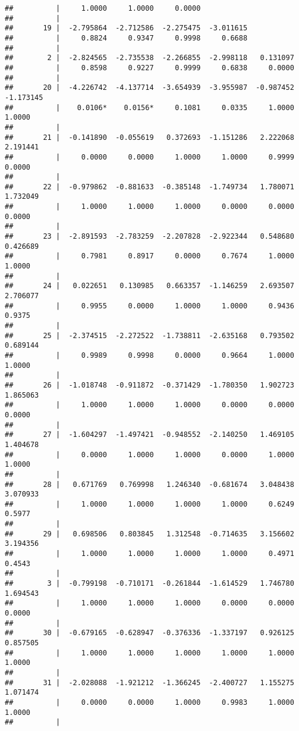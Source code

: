 \documentclass[12pt,]{article}
\begin{document}
\begin{verbatim}
##          |     1.0000     1.0000     0.0000
##          |
##       19 |  -2.795864  -2.712586  -2.275475  -3.011615
##          |     0.8824     0.9347     0.9998     0.6688
##          |
##        2 |  -2.824565  -2.735538  -2.266855  -2.998118   0.131097
##          |     0.8598     0.9227     0.9999     0.6838     0.0000
##          |
##       20 |  -4.226742  -4.137714  -3.654939  -3.955987  -0.987452  -1.173145
##          |    0.0106*    0.0156*     0.1081     0.0335     1.0000     1.0000
##          |
##       21 |  -0.141890  -0.055619   0.372693  -1.151286   2.222068   2.191441
##          |     0.0000     0.0000     1.0000     1.0000     0.9999     0.0000
##          |
##       22 |  -0.979862  -0.881633  -0.385148  -1.749734   1.780071   1.732049
##          |     1.0000     1.0000     1.0000     0.0000     0.0000     0.0000
##          |
##       23 |  -2.891593  -2.783259  -2.207828  -2.922344   0.548680   0.426689
##          |     0.7981     0.8917     0.0000     0.7674     1.0000     1.0000
##          |
##       24 |   0.022651   0.130985   0.663357  -1.146259   2.693507   2.706077
##          |     0.9955     0.0000     1.0000     1.0000     0.9436     0.9375
##          |
##       25 |  -2.374515  -2.272522  -1.738811  -2.635168   0.793502   0.689144
##          |     0.9989     0.9998     0.0000     0.9664     1.0000     1.0000
##          |
##       26 |  -1.018748  -0.911872  -0.371429  -1.780350   1.902723   1.865063
##          |     1.0000     1.0000     1.0000     0.0000     0.0000     0.0000
##          |
##       27 |  -1.604297  -1.497421  -0.948552  -2.140250   1.469105   1.404678
##          |     0.0000     1.0000     1.0000     0.0000     1.0000     1.0000
##          |
##       28 |   0.671769   0.769998   1.246340  -0.681674   3.048438   3.070933
##          |     1.0000     1.0000     1.0000     1.0000     0.6249     0.5977
##          |
##       29 |   0.698506   0.803845   1.312548  -0.714635   3.156602   3.194356
##          |     1.0000     1.0000     1.0000     1.0000     0.4971     0.4543
##          |
##        3 |  -0.799198  -0.710171  -0.261844  -1.614529   1.746780   1.694543
##          |     1.0000     1.0000     1.0000     0.0000     0.0000     0.0000
##          |
##       30 |  -0.679165  -0.628947  -0.376336  -1.337197   0.926125   0.857505
##          |     1.0000     1.0000     1.0000     1.0000     1.0000     1.0000
##          |
##       31 |  -2.028088  -1.921212  -1.366245  -2.400727   1.155275   1.071474
##          |     0.0000     0.0000     1.0000     0.9983     1.0000     1.0000
##          |

\end{verbatim}
\end{document}
